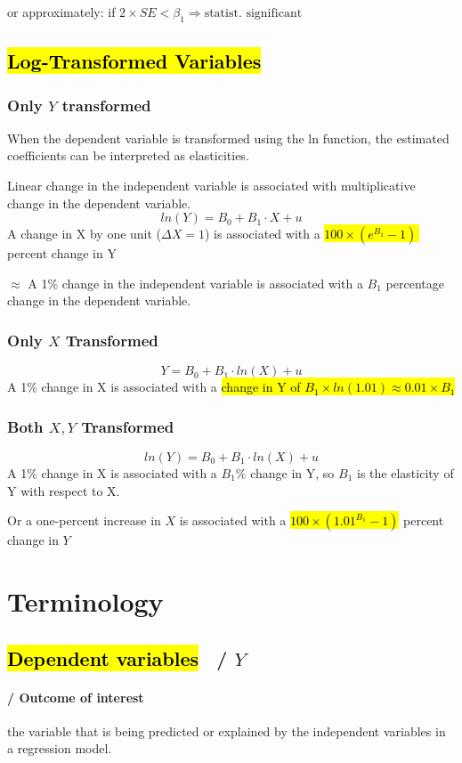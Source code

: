 \documentclass[a3paper, 8pt]{extarticle}
\begin{document}
\begin{multicols*}{5}
or approximately: if $2 \times SE < \beta_1  \Rightarrow \text{statist. significant}$

\subsection{\hl{Log-Transformed Variables}}


\subsubsection{Only $Y$ transformed}
When the dependent variable is transformed using the ln function, the estimated coefficients can be interpreted as elasticities.

Linear change in the independent variable is associated with multiplicative change in the
dependent variable.
$$ln(Y)=B_0 + B_1\cdot X + u$$
A change in X by one unit ($\Delta X=1$) is associated with a \hl{$100 \times  (e^{B_1} - 1)  \ $} percent change in Y

$\approx$ A 1\% change in the independent variable is associated with a $B_1$ percentage change in the dependent variable.


\subsubsection{Only $X$ Transformed}
$$Y=B_0 + B_1 \cdot ln(X) + u$$ A 1\% change in X is associated with a \hl{change in Y of 
$B_1 \times ln(1.01) \approx 0.01 \times B_1$}

\subsubsection{Both $X, Y$ Transformed}
$$ln(Y)=B_0 + B_1 \cdot ln(X) + u$$
A 1\% change in X is associated with a $B_1\%$ change in Y, so $B_1$ is the elasticity of Y with respect to X.

Or a one-percent increase in $X$ is associated with a \hl{$100 \times (1.01^{B_1} - 1)$} percent change in $Y$

\section{Terminology}

\subsection{ \hl{Dependent variables} \ / $Y$}

\paragraph{/ Outcome of interest} the variable that is being predicted or explained by the independent variables in a regression model. 



\end{multicols*}
\end{document}
